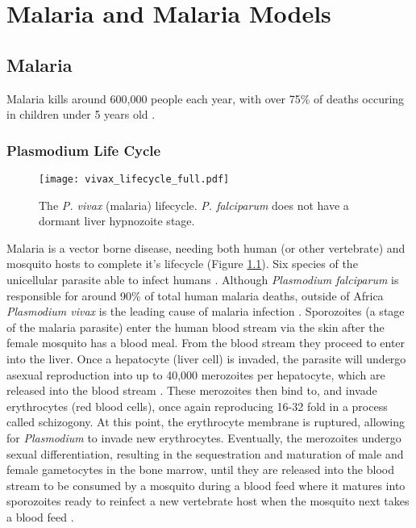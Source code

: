 \chapter{Malaria and Malaria Models}

\section{Malaria}

Malaria kills around 600,000 people each year, with over 75\% of deaths
occuring in children under 5 years old
\parencite{world_health_organization_world_2022}.

\subsection*{Plasmodium Life Cycle}

\begin{figure}[htbp]
    \centering
    \texttt{[image: vivax\_lifecycle\_full.pdf]}
    \caption{
        The \emph{P. vivax} (malaria) lifecycle. \emph{P. falciparum}
        does not have a dormant liver hypnozoite stage.
    }
    \label{fig:mal_lc}
\end{figure}

Malaria is a vector borne disease, needing both human (or other vertebrate) and
mosquito hosts to complete it's lifecycle (Figure \ref{fig:mal_lc}). Six
species of the unicellular parasite able to infect humans
\parencite{milner_malaria_2018}. Although \textit{Plasmodium falciparum} is
responsible for around 90\% of total human malaria deaths, outside of Africa
\textit{Plasmodium vivax} is the leading cause of malaria infection
\parencite{zekar_plasmodium_2023, adams_biology_2017}. Sporozoites (a stage of
the malaria parasite) enter the human blood stream via the skin after the
female mosquito has a blood meal. From the blood stream they proceed to enter
into the liver. Once a hepatocyte (liver cell) is invaded, the parasite will
undergo asexual reproduction into up to 40,000 merozoites per hepatocyte, which
are released into the blood stream . These merozoites then bind to, and invade
erythrocytes (red blood cells), once again reproducing 16-32 fold in a process
called schizogony. At this point, the erythrocyte membrane is ruptured,
allowing for \textit{Plasmodium} to invade new erythrocytes. Eventually, the
merozoites undergo sexual differentiation, resulting in the sequestration and
maturation of male and female gametocytes in the bone marrow, until they are
released into the blood stream to be consumed by a mosquito during a blood feed
where it matures into sporozoites ready to reinfect a new vertebrate host when
the mosquito next takes a blood feed \parencite{cowman_malaria_2016}.

